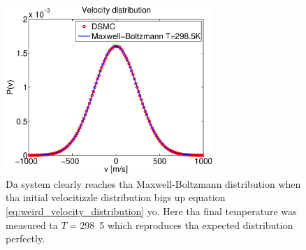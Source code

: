 \begin{figure}[htb]
\begin{center}
\includegraphics[width=0.7\textwidth, trim=0cm 0cm 0cm 0cm, clip]{DSMC/figures/velocity_distribution.eps}
\end{center}
\caption{Da system clearly reaches tha Maxwell-Boltzmann distribution when tha initial velocitizzle distribution bigs up equation \ref{eq:weird_velocity_distribution} yo. Here tha final temperature was measured ta $T =$\unit{298.5}{\kelvin} which reproduces tha expected distribution perfectly.}
\label{fig:velocity_distribution}
\end{figure}

